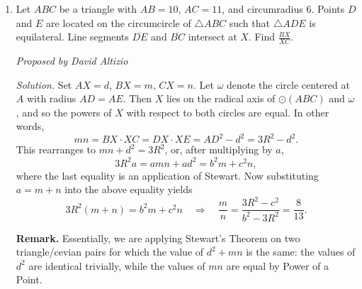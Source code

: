 \documentclass[10pt]{article}
\newcommand{\proposed}[1]
{
\vspace{5pt}
\noindent\textit{Proposed by #1}
}
\newcommand{\solution}
{
\vspace{5pt}
\noindent\textit{Solution.}\qquad
}
\begin{document}
\begin{enumerate}
\begin{center}OR\end{center}

\solution
Denote by $P$ and $Q$ the intersection points of $\Gamma$ and $\ell$, with $P$, $Y_1$, $Y_2$, and $Q$ appearing in that order.  Let $M$ denote the midpoint of the minor arc $\widehat{PQ}$.  Note that by Archimedes' Lemma, $X_1$, $Y_1$, and $M$ are collinear, as are $X_2$, $Y_2$, and $M$.  Furthermore, angle chasing yields \[\angle MY_1Q = \frac{\widehat{MQ} + \widehat{X_1P}}2 = \frac{\widehat{MP} + \widehat{PX_1}}2 = \angle MX_2X_1,\] and so $\triangle MY_1Y_2\sim\triangle MX_2X_1$ with ratio of similitude $2$.

\par Now as in the first solution let $R$ denote the radius of $\Gamma$.  Then homothety yields $\frac{X_1Y_1}{X_1M} = \frac{12}{R}$ and $\frac{X_2Y_2}{X_2M} = \frac{15}R$.  As a result, \[\frac 14 = \left(\frac{MY_1}{MX_2}\right)\left(\frac{MY_2}{MX_1}\right) = \left(1 - \frac{X_1Y_1}{X_1M}\right)\left(1 - \frac{X_2Y_2}{X_2M}\right) = \frac{(R-12)(R-15)}{R^2}.\] Solving this equation yields $R = \boxed{18 + 2\sqrt{21}}$ as before.

\item Let $ABC$ be a triangle with $AB=10$, $AC=11$, and circumradius $6$.  Points $D$ and $E$ are located on the circumcircle of $\triangle ABC$ such that $\triangle ADE$ is equilateral.  Line segments $\overline{DE}$ and $\overline{BC}$ intersect at $X$.  Find $\frac{BX}{XC}$.

\proposed{David Altizio}

\solution Set $AX=d$, $BX=m$, $CX=n$.  Let $\omega$ denote the circle centered at $A$ with radius $AD=AE$.  Then $X$ lies on the radical axis of $\odot(ABC)$ and $\omega$, and so the powers of $X$ with respect to both circles are equal.  In other words, \[mn = BX\cdot XC = DX\cdot XE = AD^2 - d^2 = 3R^2 - d^2.\] This rearranges to $mn+d^2 = 3R^2$, or, after multiplying by $a$, \[3R^2a = amn + ad^2 = b^2m+c^2n,\] where the last equality is an application of Stewart.  Now substituting $a=m+n$ into the above equality yields \[3R^2(m+n) = b^2m+c^2n\quad\Rightarrow\quad \frac{m}{n} = \dfrac{3R^2-c^2}{b^2-3R^2} = \boxed{\frac{8}{13}}.\]

\vspace{6pt}

\textbf{Remark. }Essentially, we are applying Stewart's Theorem on two triangle/cevian pairs for which the value of $d^2 + mn$ is the same: the values of $d^2$ are identical trivially, while the values of $mn$ are equal by Power of a Point.


\end{enumerate}
\end{document}
